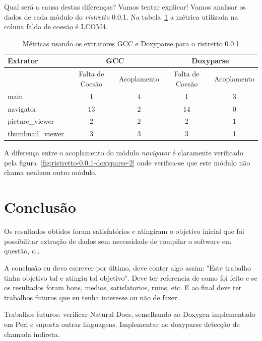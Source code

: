 Qual será a causa destas diferenças? Vamos tentar explicar! Vamos analisar os
dados de cada módulo do {\it ristretto} 0.0.1. Na
tabela~\ref{tab:comparacao-metricas-ristretto-0.0.1} a métrica utilizada na
coluna falda de coesão é LCOM4.

\begin{table}
\caption{Métricas usando os extratores GCC e Doxyparse para o ristretto 0.0.1}
\centering
\begin{tabular}{| l | c c | c c |}
\hline
Extrator          & \multicolumn{2}{|c|}{GCC}        & \multicolumn{2}{|c|}{Doxyparse} \\
\hline
                  & Falta de Coesão & Acoplamento    & Falta de Coesão & Acoplamento   \\
\hline
main              & 1               & 4              & 1               & 3             \\
navigator         & 13              & 2              & 14              & 0             \\
picture\_viewer   & 2               & 2              & 2               & 1             \\
thumbnail\_viewer & 3               & 3              & 3               & 1             \\
\hline
\end{tabular}
\label{tab:comparacao-metricas-ristretto-0.0.1}
\end{table}

A diferença entre o acoplamento do módulo {\it navigator} é claramente
verificado pela figura~\ref{fig:ristretto-0.0.1-doxyparse-2} onde verifica-se que
este módulo não chama nenhum outro módulo.

\chapter{Conclusão} \label{ch:conclusao}

Os resultados obtidos foram satisfatórios e atingiram o objetivo inicial que
foi possibilitar extração de dados sem necessidade de compilar o software em
questão, c\ldots

A conclusão eu devo escrever por último, deve conter algo assim: "Este trabalho
tinha objetivo tal e atingiu tal objetivo". Deve ter referencia de como foi
feito e se os resultados foram bons, medios, satisfatorios, ruins, etc. E ao
final deve ter trabalhos futuros que eu tenha interesse ou não de fazer.

Trabalhos futuros: verificar Natural Docs, semelhando ao Doxygen implementado
em Perl e suporta outras linguagens. Implementar no doxyparse detecção de chamada
indireta.
